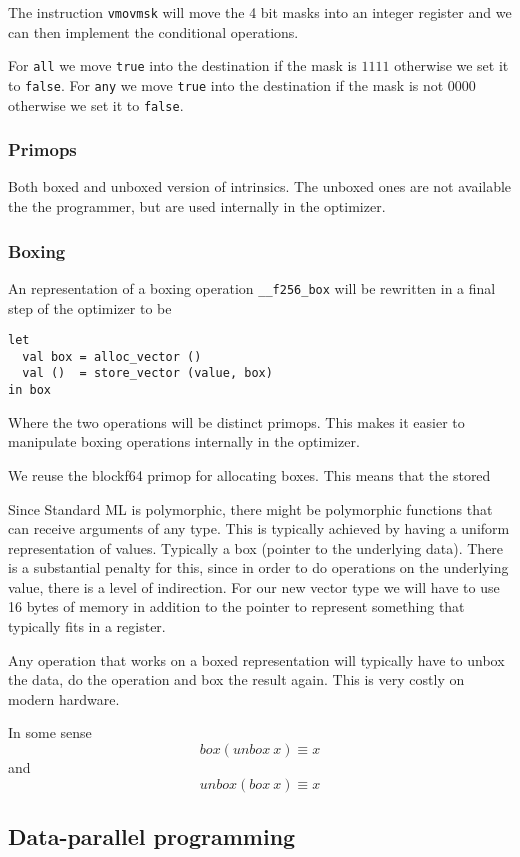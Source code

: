 \documentclass{article}
\begin{document}
The instruction \verb!vmovmsk! will move the 4 bit masks into an integer register and we can then implement the conditional operations.

For \verb!all! we move \verb!true! into the destination if the mask is $1111$ otherwise we set it to \verb!false!.
For \verb!any! we move \verb!true! into the destination if the mask is not $0000$ otherwise we set it to \verb!false!.

\subsubsection{Primops}

Both boxed and unboxed version of intrinsics. The unboxed ones are not available the the programmer, but are used internally in the optimizer.

\subsubsection{Boxing}

An representation of a boxing operation \verb!__f256_box! will be rewritten in a final step of the optimizer to be
\begin{lstlisting}
let
  val box = alloc_vector ()
  val ()  = store_vector (value, box)
in box
\end{lstlisting}
Where the two operations will be distinct primops. This makes it easier to manipulate boxing operations internally in the optimizer.


We reuse the blockf64 primop for allocating boxes. This means that the stored 

Since Standard ML is polymorphic, there might be polymorphic functions that can receive arguments of any type. This is typically achieved by having a uniform representation of values. Typically a box (pointer to the underlying data). There is a substantial penalty for this, since in order to do operations on the underlying value, there is a level of indirection. For our new vector type we will have to use 16 bytes of memory in addition to the pointer to represent something that typically fits in a register.

Any operation that works on a boxed representation will typically have to unbox the data, do the operation and box the result again. This is very costly on modern hardware.

In some sense
\[
    box (unbox\ x) \equiv x
\]
and
\[
    unbox (box\ x) \equiv x
\]

\subsection{Data-parallel programming}
\end{document}
